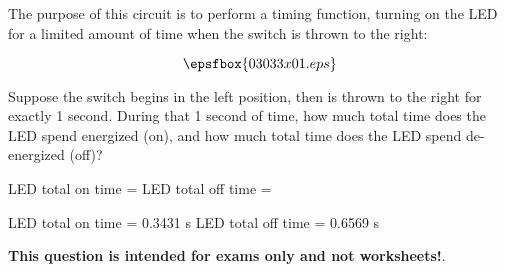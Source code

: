 

The purpose of this circuit is to perform a timing function, turning on the LED for a limited amount of time when the switch is thrown to the right:

$$\epsfbox{03033x01.eps}$$

Suppose the switch begins in the left position, then is thrown to the right for exactly 1 second.  During that 1 second of time, how much total time does the LED spend energized (on), and how much total time does the LED spend de-energized (off)?

\vskip 10pt

LED total on time = \hskip 100pt LED total off time =







LED total on time = 0.3431 s \hskip 100pt LED total off time = 0.6569 s







{\bf This question is intended for exams only and not worksheets!}.




